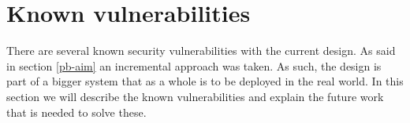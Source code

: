 \chapter{Known vulnerabilities}
\label{problems}
There are several known security vulnerabilities with the current design.
As said in section \ref{pb-aim} an incremental approach was taken.
As such, the design is part of a bigger system that as a whole is to be deployed in the real world.
In this section we will describe the known vulnerabilities
and explain the future work that is needed to solve these.









